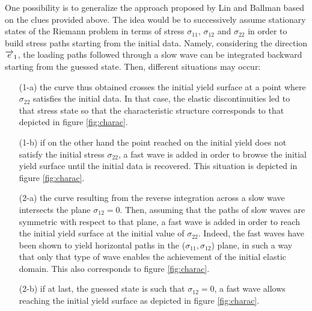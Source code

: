 One possibility is to generalize the approach proposed by Lin and Ballman \cite{Lin_et_Ballman} based on the clues provided above.
The idea would be to successively assume stationary states of the Riemann problem in terms of stress $\sigma_{11}$, $\sigma_{12}$ and $\sigma_{22}$ in order to build stress paths starting from the initial data.
Namely, considering the direction ${\overrightarrow{e}}_1$, the loading paths followed through a slow wave can be integrated backward starting from the guessed state.
Then, different situations may occur:
\begin{itemize}
\item[(1-a)] the curve thus obtained crosses the initial yield surface at a point where $\sigma_{22}$ satisfies the initial data.
  In that case, the elastic discontinuities led to that stress state so that the characteristic structure corresponds to that depicted in figure \ref{fig:charac}.
\item[(1-b)] if on the other hand the point reached on the initial yield does not satisfy the initial stress $\sigma_{22}$, a fast wave is added in order to browse the initial yield surface until the initial data is recovered.
  This situation is depicted in figure \ref{fig:charac}.
\item[(2-a)] the curve resulting from the reverse integration across a slow wave intersects the plane $\sigma_{12}=0$.
  Then, assuming that the paths of slow waves are symmetric with respect to that plane, a fast wave is added in order to reach the initial yield surface at the initial value of $\sigma_{22}$.
  Indeed, the fast waves have been shown to yield horizontal paths in the ($\sigma_{11},\sigma_{12}$) plane, in such a way that only that type of wave enables the achievement of the initial elastic domain.
  This also corresponds to figure \ref{fig:charac}.
\item[(2-b)] if at last, the guessed state is such that $\sigma_{12}=0$, a fast wave allows reaching the initial yield surface as depicted in figure \ref{fig:charac}.
\end{itemize}


